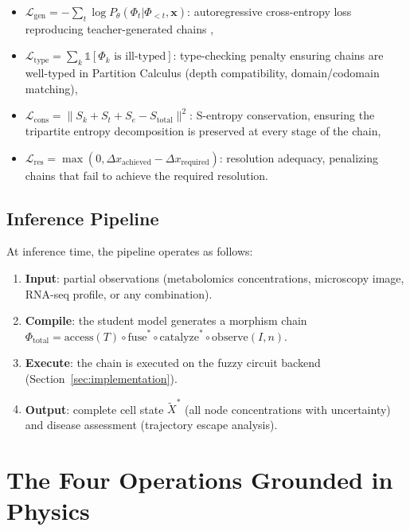\documentclass[twocolumn,10pt,a4paper]{article}
\theoremstyle{definition}
\theoremstyle{remark}
\newcommand{\morphism}{\Phi}
\newcommand{\Sk}{S_k}
\newcommand{\St}{S_t}
\newcommand{\Se}{S_e}
\begin{document}
\begin{itemize}[nosep]
    \item $\mathcal{L}_{\mathrm{gen}} = -\sum_t \log P_\theta(\morphism_t | \morphism_{<t}, \mathbf{x})$: autoregressive cross-entropy loss reproducing teacher-generated chains \citep{Brown2020},
    \item $\mathcal{L}_{\mathrm{type}} = \sum_k \mathbb{1}[\morphism_k \text{ is ill-typed}]$: type-checking penalty ensuring chains are well-typed in Partition Calculus (depth compatibility, domain/codomain matching),
    \item $\mathcal{L}_{\mathrm{cons}} = \| \Sk + \St + \Se - S_{\mathrm{total}} \|^2$: S-entropy conservation, ensuring the tripartite entropy decomposition is preserved at every stage of the chain,
    \item $\mathcal{L}_{\mathrm{res}} = \max(0, \Delta x_{\mathrm{achieved}} - \Delta x_{\mathrm{required}})$: resolution adequacy, penalizing chains that fail to achieve the required resolution.
\end{itemize}

\subsection{Inference Pipeline}

At inference time, the pipeline operates as follows:
\begin{enumerate}[nosep]
    \item \textbf{Input}: partial observations (metabolomics concentrations, microscopy image, RNA-seq profile, or any combination).
    \item \textbf{Compile}: the student model generates a morphism chain $\morphism_{\mathrm{total}} = \mathrm{access}(T) \circ \mathrm{fuse}^* \circ \mathrm{catalyze}^* \circ \mathrm{observe}(I, n)$.
    \item \textbf{Execute}: the chain is executed on the fuzzy circuit backend (Section~\ref{sec:implementation}).
    \item \textbf{Output}: complete cell state $\tilde{X}^*$ (all node concentrations with uncertainty) and disease assessment (trajectory escape analysis).
\end{enumerate}

\section{The Four Operations Grounded in Physics}
\label{sec:operations}
\end{document}
